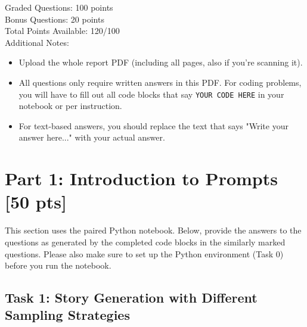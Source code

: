 \documentclass[11pt,addpoints,answers]{exam}
\begin{document}
Graded Questions: 100 points\\
Bonus Questions: 20 points\\
Total Points Available: 120/100 \\

Additional Notes:
  \begin{itemize}
      \item Upload the whole report PDF (including all pages, also if you're scanning it).
      \item All questions only require written answers in this PDF. For coding problems, you will have to fill out all code blocks that say \texttt{YOUR CODE HERE} in your notebook or per instruction.
      \item For text-based answers, you should replace the text that says "Write your answer here..." with your actual answer.
  \end{itemize}      


\clearpage\section*{Part 1: Introduction to Prompts [50 pts]}

This section uses the paired Python notebook. Below, provide the answers to the questions as generated by the completed code blocks in the similarly marked questions. 
Please also make sure to set up the Python environment (Task 0) before you run the notebook.


\subsection*{Task 1: Story Generation with Different Sampling Strategies} 
\end{document}
